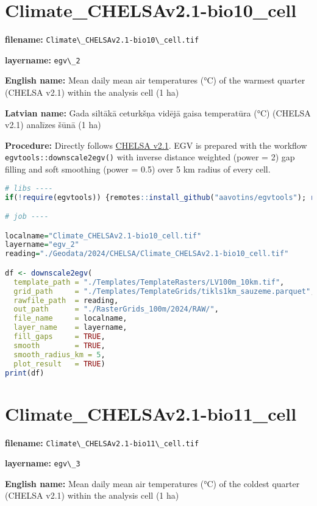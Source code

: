 \documentclass[
]{book}
\newcommand{\passthrough}[1]{#1}
\begin{document}
\section{Climate\_CHELSAv2.1-bio10\_cell}\label{ch06.002}

\textbf{filename:} \passthrough{\lstinline!Climate\_CHELSAv2.1-bio10\_cell.tif!}

\textbf{layername:} \passthrough{\lstinline!egv\_2!}

\textbf{English name:} Mean daily mean air temperatures (°C) of the warmest quarter (CHELSA v2.1) within the analysis cell (1 ha)

\textbf{Latvian name:} Gada siltākā ceturkšņa vidējā gaisa temperatūra (°C) (CHELSA v2.1) analīzes šūnā (1 ha)

\textbf{Procedure:} Directly follows \hyperref[Ch04.11]{CHELSA v2.1}. EGV is prepared with the
workflow \passthrough{\lstinline!egvtools::downscale2egv()!} with inverse distance weighted (power = 2)
gap filling and soft smoothing (power = 0.5) over 5 km radius of every cell.

\begin{lstlisting}[language=R]
# libs ----
if(!require(egvtools)) {remotes::install_github("aavotins/egvtools"); require(egvtools)}

# job ----

localname="Climate_CHELSAv2.1-bio10_cell.tif"
layername="egv_2"
reading="./Geodata/2024/CHELSA/Climate_CHELSAv2.1-bio10_cell.tif"

df <- downscale2egv(
  template_path = "./Templates/TemplateRasters/LV100m_10km.tif",
  grid_path     = "./Templates/TemplateGrids/tikls1km_sauzeme.parquet",
  rawfile_path  = reading,
  out_path      = "./RasterGrids_100m/2024/RAW/",
  file_name     = localname,
  layer_name    = layername,
  fill_gaps     = TRUE,
  smooth        = TRUE,
  smooth_radius_km = 5,
  plot_result   = TRUE)
print(df)
\end{lstlisting}

\section{Climate\_CHELSAv2.1-bio11\_cell}\label{ch06.003}

\textbf{filename:} \passthrough{\lstinline!Climate\_CHELSAv2.1-bio11\_cell.tif!}

\textbf{layername:} \passthrough{\lstinline!egv\_3!}

\textbf{English name:} Mean daily mean air temperatures (°C) of the coldest quarter (CHELSA v2.1) within the analysis cell (1 ha)
\end{document}

